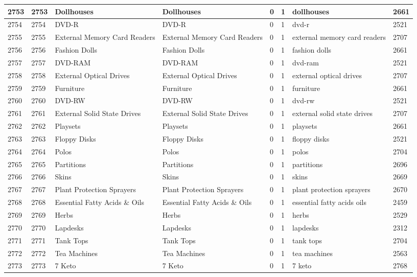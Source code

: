 \begin{longtable}{|l|l|l|l|l|l|l|l|}
2753 & 2753 & Dollhouses & Dollhouses & 0 & 1 & dollhouses & 2661 \\ \hline 
2754 & 2754 & DVD-R & DVD-R & 0 & 1 & dvd-r & 2521 \\ \hline 
2755 & 2755 & External Memory Card Readers & External Memory Card Readers & 0 & 1 & external memory card readers & 2707 \\ \hline 
2756 & 2756 & Fashion Dolls & Fashion Dolls & 0 & 1 & fashion dolls & 2661 \\ \hline 
2757 & 2757 & DVD-RAM & DVD-RAM & 0 & 1 & dvd-ram & 2521 \\ \hline 
2758 & 2758 & External Optical Drives & External Optical Drives & 0 & 1 & external optical drives & 2707 \\ \hline 
2759 & 2759 & Furniture & Furniture & 0 & 1 & furniture & 2661 \\ \hline 
2760 & 2760 & DVD-RW & DVD-RW & 0 & 1 & dvd-rw & 2521 \\ \hline 
2761 & 2761 & External Solid State Drives & External Solid State Drives & 0 & 1 & external solid state drives & 2707 \\ \hline 
2762 & 2762 & Playsets & Playsets & 0 & 1 & playsets & 2661 \\ \hline 
2763 & 2763 & Floppy Disks & Floppy Disks & 0 & 1 & floppy disks & 2521 \\ \hline 
2764 & 2764 & Polos & Polos & 0 & 1 & polos & 2704 \\ \hline 
2765 & 2765 & Partitions & Partitions & 0 & 1 & partitions & 2696 \\ \hline 
2766 & 2766 & Skins & Skins & 0 & 1 & skins & 2669 \\ \hline 
2767 & 2767 & Plant Protection Sprayers & Plant Protection Sprayers & 0 & 1 & plant protection sprayers & 2670 \\ \hline 
2768 & 2768 & Essential Fatty Acids \& Oils & Essential Fatty Acids \& Oils & 0 & 1 & essential fatty acids oils & 2459 \\ \hline 
2769 & 2769 & Herbs & Herbs & 0 & 1 & herbs & 2529 \\ \hline 
2770 & 2770 & Lapdesks & Lapdesks & 0 & 1 & lapdesks & 2312 \\ \hline 
2771 & 2771 & Tank Tops & Tank Tops & 0 & 1 & tank tops & 2704 \\ \hline 
2772 & 2772 & Tea Machines & Tea Machines & 0 & 1 & tea machines & 2563 \\ \hline 
2773 & 2773 & 7 Keto & 7 Keto & 0 & 1 & 7 keto & 2768 \\ \hline 

\end{longtable}
